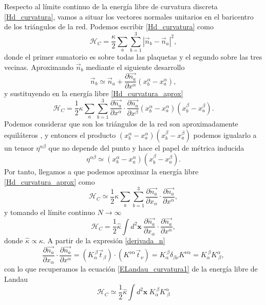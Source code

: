 Respecto al límite continuo de la energía libre de curvatura discreta
\eqref{Hd_curvatura}, vamos a situar los vectores normales unitarios en el
baricentro de los triángulos de la red. Podemos escribir \eqref{Hd_curvatura} como
\begin{equation}\label{Hd_curvatura_aprox}
\mathcal{H}_C=\frac{\kappa}{2}\sum_a\sum_{b=1}^{3}|\vec{n}_b-\vec{n}_a|^2,
\end{equation}
donde el primer sumatorio es sobre todas las plaquetas y el segundo sobre las
tres vecinas. Aproximando $\vec{n}_{b}$ mediante el siguiente desarrollo
\begin{equation*}
\vec{n}_b\simeq\vec{n}_a+\frac{\partial \vec{n_a}}{\partial x^{\alpha}}(x_b^{\alpha}-x_a^{\alpha}),
\end{equation*}
y sustituyendo en la energía libre \eqref{Hd_curvatura_aprox} 
\begin{equation*}
\mathcal{H}_C=\frac{1}{2}\kappa\sum_a\sum_{b=1}^{3}\frac{\partial
  \vec{n_a}}{\partial x^{\alpha}}\cdot\frac{\partial \vec{n_a}}{\partial x^{\beta}} (x_b^{\alpha}-x_a^{\alpha})(x_b^{\beta}-x_a^{\beta}).
\end{equation*}
Podemos considerar que son los triángulos de la red son aproximadamente
equiláteros \cite{Aranovitz_Fuctuations,Kroll_Discretizations}, y entonces el producto
$(x_b^{\alpha}-x_a^{\alpha})(x_b^{\beta}-x_a^{\beta})$ podemos igualarlo a un
tensor $\eta^{\alpha\beta}$ que no depende del punto y hace el papel de
métrica inducida
\begin{equation*}
\eta^{\alpha\beta}\simeq(x_b^{\alpha}-x_a^{\alpha})(x_b^{\beta}-x_a^{\beta}).
\end{equation*}
Por tanto, llegamos a que podemos aproximar la energía libre
\eqref{Hd_curvatura_aprox} como
\begin{equation*}
\mathcal{H}_C\simeq\frac{1}{2}\kappa\sum_a\sum_{b=1}^{3}\frac{\partial
  \vec{n_a}}{\partial x_{\alpha}}\cdot\frac{\partial \vec{n_a}}{\partial x^{\alpha}},
\end{equation*}
y tomando el límite continuo $N\rightarrow \infty$
\begin{equation*}
\mathcal{H}_C=\frac{1}{2}\hat{\kappa}\int d^2\mathbf{x}\ \frac{\partial
  \vec{n_a}}{\partial x_{\alpha}}\cdot\frac{\partial \vec{n_a}}{\partial x^{\alpha}},
\end{equation*}
donde $\hat{\kappa}\propto \kappa$. A partir de la expresión \eqref{derivada_n}
\begin{equation*}
\frac{\partial \vec{n_a}}{\partial x_{\alpha}}\cdot\frac{\partial
  \vec{n_a}}{\partial x^{\alpha}}=(K_{\alpha}^{\ \beta}\vec{t}_ {\beta})\cdot(K^{\nu
  \alpha}\vec{t}_{\nu})=K_{\alpha}^{\ \beta}\delta_ {\beta\nu}K^{\nu \alpha}=K_{\alpha}^{\ \beta}K^{\alpha}_{\ \beta},
\end{equation*}
con lo que recuperamos la ecuación \eqref{ELandau_curvatura1} de la energía libre de Landau
\begin{equation*}
\mathcal{H}_C\simeq\frac{1}{2}\hat{\kappa}\int d^2\mathbf{x}\ K_{\alpha}^{\ \beta}K^{\alpha}_{\ \beta}
\end{equation*}

